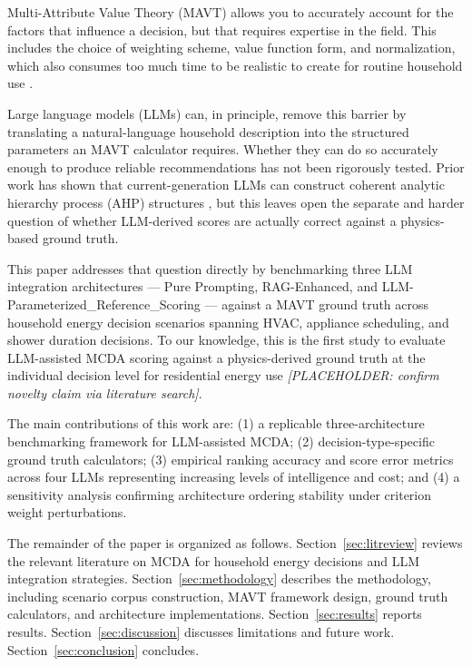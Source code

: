 \documentclass[final,3p,times]{elsarticle}
\begin{document}
Multi-Attribute Value Theory (MAVT) allows you to accurately account
for the factors that influence a decision, but that requires expertise
in the field. This includes the choice of weighting scheme, value
function form, and normalization, which also consumes too much time to
be realistic to create for routine household use
\cite{desouza2022,huangburgherr2024}.

Large language models (LLMs) can, in principle, remove this barrier
by translating a natural-language household description into the
structured parameters an MAVT calculator requires. Whether they can
do so accurately enough to produce reliable recommendations has not
been rigorously tested. Prior work has shown that current-generation
LLMs can construct coherent analytic hierarchy process (AHP)
structures \cite{svoboda2024}, but this leaves open the separate and
harder question of whether LLM-derived scores are actually correct
against a physics-based ground truth.

This paper addresses that question directly by benchmarking three LLM
integration architectures --- Pure Prompting, RAG-Enhanced, and LLM-Parameterized\_Reference\_Scoring
--- against a MAVT ground truth across household energy decision
scenarios spanning HVAC, appliance scheduling, and shower duration
decisions. To our knowledge, this is the first study to evaluate
LLM-assisted MCDA scoring against a physics-derived ground truth at
the individual decision level for residential energy use
\textit{[PLACEHOLDER: confirm novelty claim via literature search]}.

The main contributions of this work are: (1) a replicable
three-architecture benchmarking framework for LLM-assisted MCDA;
(2) decision-type-specific ground truth calculators; (3) empirical
ranking accuracy and score error metrics across four LLMs representing
increasing levels of intelligence and cost; and (4) a sensitivity
analysis confirming architecture ordering stability under criterion
weight perturbations.

The remainder of the paper is organized as follows. Section~\ref{sec:litreview}
reviews the relevant literature on MCDA for household energy decisions
and LLM integration strategies. Section~\ref{sec:methodology} describes
the methodology, including scenario corpus construction, MAVT framework
design, ground truth calculators, and architecture implementations.
Section~\ref{sec:results} reports results. Section~\ref{sec:discussion}
discusses limitations and future work. Section~\ref{sec:conclusion}
concludes.
\end{document}
